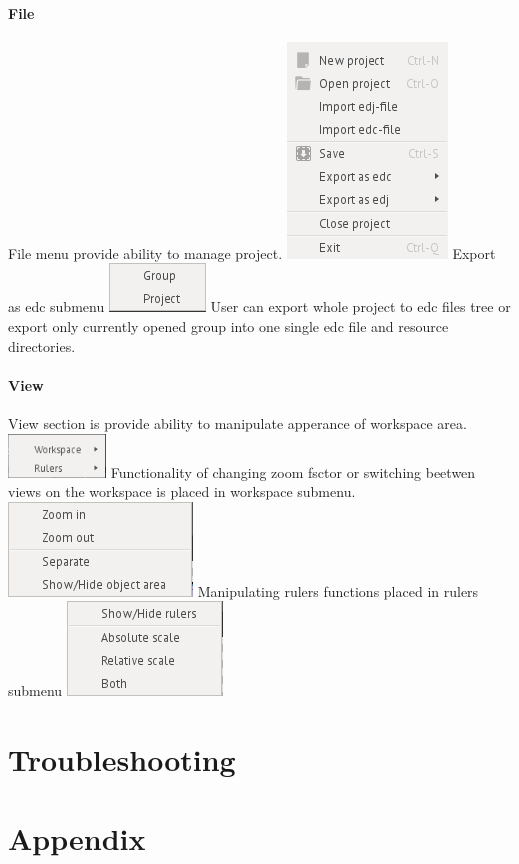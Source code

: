 \documentclass[titlepage,oneside,11pt]{book}
\begin{document}
\subsubsection{File}
File menu provide ability to manage project. 
\includegraphics{images/file_menu.png}
Export as edc submenu
\includegraphics{images/file_export_as_edc_submenu.png}
User can export whole project to edc files tree or export only currently opened group into one single edc file and resource directories.
\subsubsection{View}
View section is provide ability to manipulate apperance of workspace area.
\includegraphics{images/view_menu.png}
Functionality of changing zoom fsctor or switching beetwen views on the workspace is placed in workspace submenu.
\includegraphics{images/view_workspace_submenu.png}
Manipulating rulers functions placed in rulers submenu
\includegraphics{images/view_rulers_submenu.png}
\chapter{Troubleshooting}
\chapter{Appendix}
\end{document}
